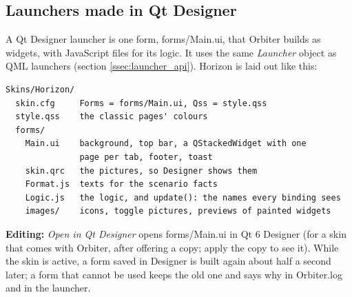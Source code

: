 \documentclass[Orbiter Developer Manual.tex]{subfiles}
\begin{document}
\begin{sloppypar}
\subsection{Launchers made in Qt Designer}
A Qt Designer launcher is one form, forms/Main.ui, that Orbiter builds as widgets, with JavaScript files for its logic. It uses the same \textit{Launcher} object as QML launchers (section \ref{ssec:launcher_api}). Horizon is laid out like this:

\begin{lstlisting}[language=OSFS]
Skins/Horizon/
  skin.cfg     Forms = forms/Main.ui, Qss = style.qss
  style.qss    the classic pages' colours
  forms/
    Main.ui    background, top bar, a QStackedWidget with one
               page per tab, footer, toast
    skin.qrc   the pictures, so Designer shows them
    Format.js  texts for the scenario facts
    Logic.js   the logic, and update(): the names every binding sees
    images/    icons, toggle pictures, previews of painted widgets
\end{lstlisting}

\noindent
\textbf{Editing:} \textit{Open in Qt Designer} opens forms/Main.ui in Qt 6 Designer (for a skin that comes with Orbiter, after offering a copy; apply the copy to see it). While the skin is active, a form saved in Designer is built again about half a second later; a form that cannot be used keeps the old one and says why in Orbiter.log and in the launcher.


\end{sloppypar}
\end{document}

